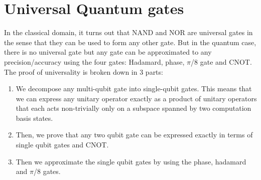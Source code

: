\section{Universal Quantum gates}
In the classical domain, it turns out that {\scshape NAND} and {\scshape NOR} are universal gates in the sense that they can be used to form any other gate. But in the quantum case, there is no universal gate but any gate can be approximated to any precision/accuracy using the four gates: Hadamard, phase, $\pi$/8 gate and {\scshape CNOT}. \\
The proof of universality is broken down in 3 parts: 
\begin{enumerate}
\item We decompose any multi-qubit gate into single-qubit gates. This means that we can express any unitary operator  exactly as a product of unitary operators that each acts non-trivially only on a subspace spanned by two computation basis states.
\item Then, we prove that any two qubit gate can be expressed exactly in terms of single qubit gates and {\scshape CNOT}.
\item Then we approximate the single qubit gates by using the phase, hadamard and $\pi$/8 gates.
\end{enumerate}

